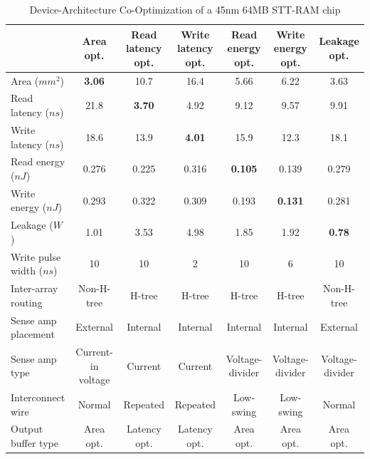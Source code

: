 \begin{table}[t]
\centering
\caption{Device-Architecture Co-Optimization of a 45nm 64MB STT-RAM chip}
\label{tb:bigtable}
\begin{tabular}{| l | c | c | c | c | c | c |}
\hline\hline
& Area opt. & Read latency opt. & Write latency opt. & Read energy opt. & Write energy opt. & Leakage opt. \\
\hline
Area ($mm^2$) & \textbf{3.06} & 10.7 & 16.4 & 5.66 & 6.22 & 3.63 \\
\hline
Read latency ($ns$) & 21.8 & \textbf{3.70} & 4.92 & 9.12 & 9.57 &	9.91 \\
\hline
Write latency ($ns$) & 18.6	& 13.9	& \textbf{4.01}	& 15.9	& 12.3	& 18.1 \\
\hline
Read energy ($nJ$) & 0.276	& 0.225	& 0.316	& \textbf{0.105}	& 0.139	& 0.279 \\
\hline
Write energy ($nJ$) & 0.293	& 0.322	& 0.309	& 0.193	& \textbf{0.131}	& 0.281\\
\hline
Leakage ($W$) & 1.01	& 3.53	& 4.98	& 1.85	& 1.92	& \textbf{0.78}\\
\hline\hline
Write pulse width ($ns$) & 10 & 10 & 2 & 10 & 6 & 10 \\
\hline
Inter-array routing & Non-H-tree & H-tree & H-tree & H-tree & H-tree & Non-H-tree \\
\hline
Sense amp placement & External & Internal & Internal & Internal & Internal & External \\
\hline
Sense amp type & Current-in voltage & Current & Current & Voltage-divider & Voltage-divider & Voltage-divider \\
\hline
Interconnect wire & Normal & Repeated & Repeated & Low-swing & Low-swing & Normal \\
\hline
Output buffer type & Area opt. & Latency opt. & Latency opt. & Area opt. & Area opt. & Area opt. \\
\hline\hline
\end{tabular}
\end{table} 